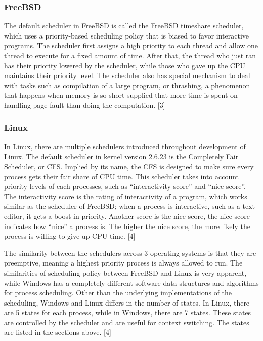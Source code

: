 \documentclass[10pt,a4paper]{article}
\begin{document}
\subsubsection{FreeBSD}
The default scheduler in FreeBSD is called the FreeBSD timeshare scheduler, which uses a priority-based scheduling policy that is biased to favor interactive programs. The scheduler first assigns a high priority to each thread and allow one thread to execute for a fixed amount of time. After that, the thread who just ran has their priority lowered by the scheduler, while those who gave up the CPU maintains their priority level. The scheduler also has special mechanism to deal with tasks such as compilation of a large program, or thrashing, a phenomenon that happens when memory is so short-supplied that more time is spent on handling page fault than doing the computation. [3]

\subsubsection{Linux}
In Linux, there are multiple schedulers introduced throughout development of Linux. The default scheduler in kernel version 2.6.23 is the Completely Fair Scheduler, or CFS. Implied by its name, the CFS is designed to make sure every process gets their fair share of CPU time. This scheduler takes into account priority levels of each processes, such as “interactivity score” and “nice score”. The interactivity score is the rating of interactivity of a program, which works similar as the scheduler of FreeBSD; when a process is interactive, such as a text editor, it gets a boost in priority. Another score is the nice score, the nice score indicates how “nice” a process is. The higher the nice score, the more likely the process is willing to give up CPU time. [4]

The similarity between the schedulers across 3 operating systems is that they are preemptive, meaning a highest priority process is always allowed to run. The similarities of scheduling policy between FreeBSD and Linux is very apparent, while Windows has a completely different software data structures and algorithms for process scheduling. Other than the underlying implementations of the scheduling, Windows and Linux differs in the number of states. In Linux, there are 5 states for each process, while in Windows, there are 7 states. These states are controlled by the scheduler and are useful for context switching. The states are listed in the sections above. [4]
\end{document}
